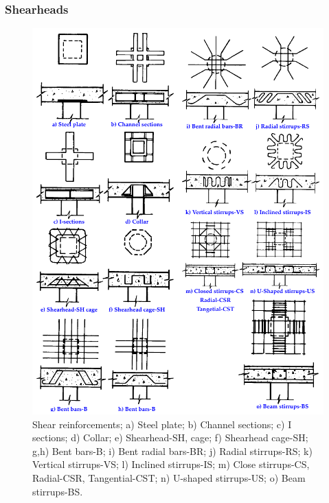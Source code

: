 \subsubsection{Shearheads}
\begin{figure}\centering
\includegraphics[width=\columnwidth]{Figures/tikzout/h74f1m.pdf}
\caption{Shear reinforcements\citep{hawkins1974a}; a) Steel plate\citep{moe1961}; b) Channel sections\citep{hawkins1974}; c) $\mathrm{I}$ sections\citep{hawkins1974}; d) Collar\citep{tasker1963}; e) Shearhead-SH, cage; f) Shearhead cage-SH; g,h) Bent bars-B; i) Bent radial bars-BR; j) Radial stirrups-RS; k) Vertical stirrups-VS; l) Inclined stirrups-IS; m) Close stirrups-CS, Radial-CSR, Tangential-CST; n) U-shaped stirrups-US; o) Beam stirrups-BS.}\label{h74f1}
\end{figure}

